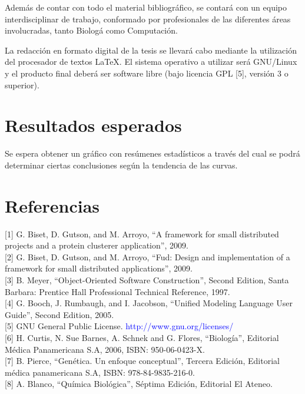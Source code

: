 \documentclass[12pt,a4paper]{article}
\begin{document}
\par Además de contar con todo el material bibliográfico, se contará con un equipo interdisciplinar de trabajo, conformado por profesionales de las diferentes áreas involucradas, tanto Biolog\'a como Computaci\'on. 

\par La redacción en formato digital de la tesis se llevará cabo mediante la utilización del procesador de textos \LaTeX. El sistema operativo a utilizar será GNU/Linux y el producto final deberá ser software libre (bajo licencia GPL [5], versión 3 o superior).

\section{Resultados esperados}
Se espera obtener un gráfico con resúmenes estadísticos a través del cual se podrá determinar ciertas conclusiones según la tendencia de las curvas. 

\section*{Referencias}
[1] G. Biset, D. Gutson, and M. Arroyo, “A framework for small distributed projects and a protein clusterer application”, 2009. \\

[2] G. Biset, D. Gutson, and M. Arroyo, “Fud: Design and implementation of a framework for small distributed applications”, 2009. \\

[3] B. Meyer, “Object-Oriented Software Construction”, Second Edition, Santa Barbara: Prentice Hall Professional Technical Reference, 1997. \\

[4] G. Booch, J. Rumbaugh, and I. Jacobson, “Unified Modeling Language User Guide”, Second Edition, 2005. \\

[5] GNU General Public License. \textcolor{blue}{http://www.gnu.org/licenses/} \\

[6] H. Curtis, N. Sue Barnes, A. Schnek and G. Flores, “Biología”, Editorial Médica Panamericana S.A, 2006, ISBN: 950-06-0423-X. \\

[7] B. Pierce, “Genética. Un enfoque conceptual”, Tercera Edición, Editorial médica panamericana S.A, ISBN: 978-84-9835-216-0. \\

[8] A. Blanco, “Química Biológica”, Séptima Edición, Editorial El Ateneo.
\end{document}
